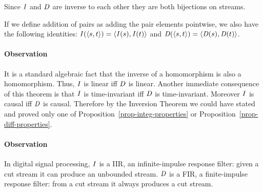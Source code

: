 Since $\mathit{I}$ and $\mathit{D}$ are inverse to each other they are both bijections on streams.

If we define addition of pairs as adding the pair elements pointwise, we also have
the following identities: $\mathit{I}(\langle s,t \rangle) = \langle \mathit{I}(s),\mathit{I}(t) \rangle$ and $\mathit{D}(\langle s,t \rangle) = \langle \mathit{D}(s),\mathit{D}(t) \rangle$.

\paragraph{Observation}
It is a standard algebraic fact that the inverse of a homomorphism is also a homomorphism.
Thus, $\mathit{I}$ is linear iff $\mathit{D}$ is linear. Another immediate consequence of this theorem is that $\mathit{I}$ is time-invariant iff
$\mathit{D}$ is time-invariant.
Moreover $\mathit{I}$ is causal iff
$\mathit{D}$ is causal. Therefore by the Inversion Theorem we could have stated and proved only one of Proposition~\ref{prop-integ-properties} or
Proposition~\ref{prop-diff-properties}.


\paragraph{Observation} In digital signal processing, $\mathit{I}$ is a IIR, an infinite-impulse response filter: given a cut stream it can produce an unbounded stream.  $\mathit{D}$ is a FIR, a finite-impulse response filter: from a cut stream it always produces a cut stream.


\begin{comment}
\begin{lemma}
  The operators $\I$ and $\D$ are linear.
\end{lemma}
\begin{proof}
  $\D$ is the composition of three linear
  operators.Let us prove the statement for $\I$.
  $$
\begin{aligned}
  (\I(a + b))[t] &= \sum_{k \leq t}(a + b)[t] & \mbox{ definition of }\D \\
  &= \sum_{k \leq t} a[k] + \sum_{k \leq t} b[k] & \mbox{ commutativity, linearity of + } \\
  &= \I(a)[t] + \I(b)[t] & \mbox{ definition of }\I.
\end{aligned}
$$

An alternative proof: using the linearity of $\zm$ we can show
that $\alpha=\I(a)+\I(b)$ satisfies $\alpha = \zm(\alpha) + a+b$.
It follows that $\alpha=\I(a+b)$.
\end{proof}

By substituting $a + b$ with $a + (-b)$ we obtain that $\I(a - b) = \I(a) - \I(b)$,
$\D(a - b) = \D(a) - \D(b)$ and $\zm(a - b) = \zm(a) - \zm(b)$.
\end{comment}
